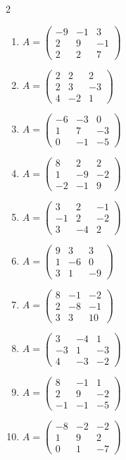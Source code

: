 \begin{multicols}{2}
\begin{enumerate}[label=\arabic*., leftmargin=*]
\item $A=\begin{pmatrix}-9 & -1 & 3\\ 2 & 9 & -1\\ 2 & 2 & 7\end{pmatrix}$
\item $A=\begin{pmatrix}2 & 2 & 2\\ 2 & 3 & -3\\ 4 & -2 & 1\end{pmatrix}$
\item $A=\begin{pmatrix}-6 & -3 & 0\\ 1 & 7 & -3\\ 0 & -1 & -5\end{pmatrix}$
\item $A=\begin{pmatrix}8 & 2 & 2\\ 1 & -9 & -2\\ -2 & -1 & 9\end{pmatrix}$
\item $A=\begin{pmatrix}3 & 2 & -1\\ -1 & 2 & -2\\ 3 & -4 & 2\end{pmatrix}$
\item $A=\begin{pmatrix}9 & 3 & 3\\ 1 & -6 & 0\\ 3 & 1 & -9\end{pmatrix}$
\item $A=\begin{pmatrix}8 & -1 & -2\\ 2 & -8 & -1\\ 3 & 3 & 10\end{pmatrix}$
\item $A=\begin{pmatrix}3 & -4 & 1\\ -3 & 1 & -3\\ 4 & -3 & -2\end{pmatrix}$
\item $A=\begin{pmatrix}8 & -1 & 1\\ 2 & 9 & -2\\ -1 & -1 & -5\end{pmatrix}$
\item $A=\begin{pmatrix}-8 & -2 & -2\\ 1 & 9 & 2\\ 0 & 1 & -7\end{pmatrix}$

\end{enumerate}
\end{multicols}
